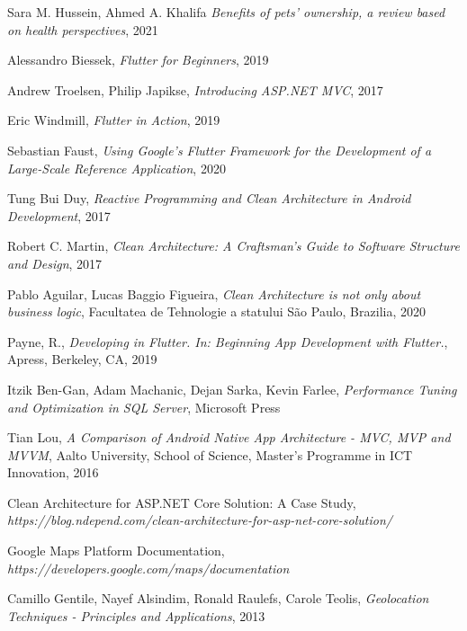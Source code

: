 \begin{thebibliography}{9}

Sara M. Hussein, Ahmed A. Khalifa \textit{Benefits of pets' ownership, a review based on health perspectives}, 2021

Alessandro Biessek, \textit{Flutter for Beginners}, 2019

Andrew Troelsen, Philip Japikse, \textit{Introducing ASP.NET MVC}, 2017

Eric Windmill, \textit{Flutter in Action}, 2019

Sebastian Faust, \textit{Using Google's Flutter Framework for the Development of a Large-Scale Reference Application}, 2020

Tung Bui Duy, \textit{Reactive Programming and Clean Architecture in Android Development}, 2017

Robert C. Martin, \textit{Clean Architecture: A Craftsman's Guide to Software Structure and Design}, 2017

Pablo Aguilar, Lucas Baggio Figueira, \textit{Clean Architecture is not only about business logic}, Facultatea de Tehnologie a statului São Paulo, Brazilia, 2020

Payne, R., \textit{Developing in Flutter. In: Beginning App Development with Flutter.}, Apress, Berkeley, CA, 2019

Itzik Ben-Gan, Adam Machanic, Dejan Sarka, Kevin Farlee, \textit{Performance Tuning and Optimization in SQL Server}, Microsoft Press

Tian Lou, \textit{A Comparison of Android Native App Architecture - MVC, MVP and MVVM}, Aalto University, School of Science, Master's Programme in ICT Innovation, 2016

Clean Architecture for ASP.NET Core Solution: A Case Study, \newline \textit{https://blog.ndepend.com/clean-architecture-for-asp-net-core-solution/}

Google Maps Platform Documentation, \newline \textit{https://developers.google.com/maps/documentation}

Camillo Gentile, Nayef Alsindim, Ronald Raulefs, Carole Teolis, \textit{Geolocation Techniques - Principles and Applications}, 2013


\end{thebibliography}
